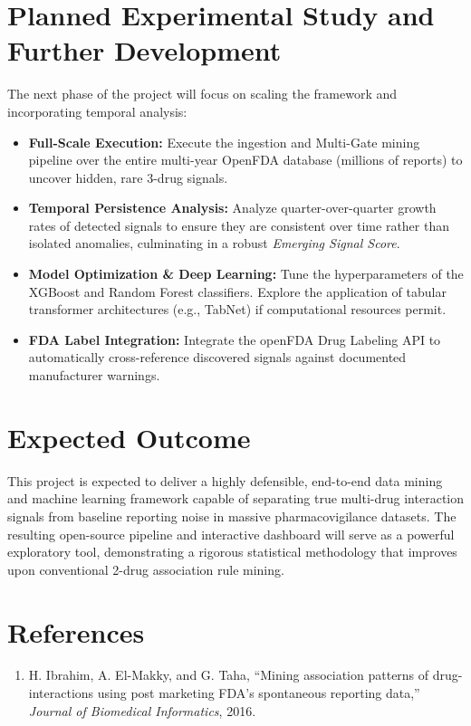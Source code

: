 \documentclass[11pt,a4paper]{article}
\begin{document}
\section*{Planned Experimental Study and Further Development}
The next phase of the project will focus on scaling the framework and incorporating temporal analysis:
\begin{itemize}
    \item \textbf{Full-Scale Execution:} Execute the ingestion and Multi-Gate mining pipeline over the entire multi-year OpenFDA database (millions of reports) to uncover hidden, rare 3-drug signals.
    \item \textbf{Temporal Persistence Analysis:} Analyze quarter-over-quarter growth rates of detected signals to ensure they are consistent over time rather than isolated anomalies, culminating in a robust \textit{Emerging Signal Score}.
    \item \textbf{Model Optimization \& Deep Learning:} Tune the hyperparameters of the XGBoost and Random Forest classifiers. Explore the application of tabular transformer architectures (e.g., TabNet) if computational resources permit.
    \item \textbf{FDA Label Integration:} Integrate the openFDA Drug Labeling API to automatically cross-reference discovered signals against documented manufacturer warnings.
\end{itemize}

\section*{Expected Outcome}
This project is expected to deliver a highly defensible, end-to-end data mining and machine learning framework capable of separating true multi-drug interaction signals from baseline reporting noise in massive pharmacovigilance datasets. The resulting open-source pipeline and interactive dashboard will serve as a powerful exploratory tool, demonstrating a rigorous statistical methodology that improves upon conventional 2-drug association rule mining.

\vspace{0.3cm}
\section*{References}
\begin{enumerate}
    \item[1] H. Ibrahim, A. El-Makky, and G. Taha, ``Mining association patterns of drug-interactions using post marketing FDA's spontaneous reporting data,'' \textit{Journal of Biomedical Informatics}, 2016.
\end{enumerate}
\end{document}
